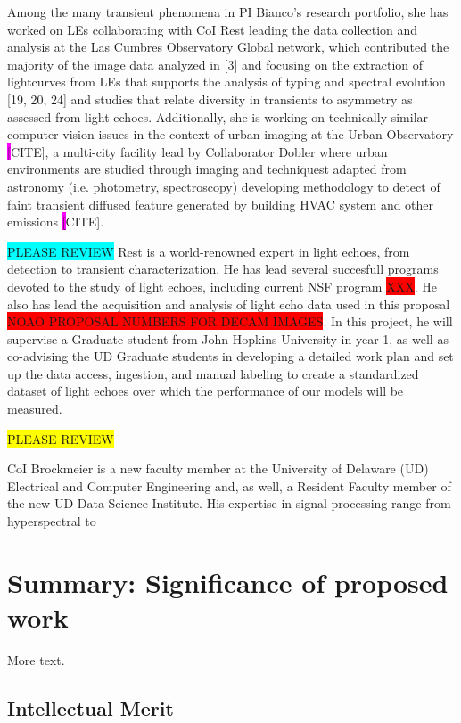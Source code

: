 \documentclass{proposalnsf}
\newcommand{\armin}[1]{\colorbox{cyan}{#1}}
\newcommand{\austin}[1]{\colorbox{yellow}{#1}}
\newcommand{\changeit}[1]{\colorbox{magenta}{#1}}
\begin{document}
Among the many transient phenomena in PI Bianco’s research portfolio, she has worked on LEs collaborating with CoI Rest leading the data collection and analysis at the Las Cumbres Observatory Global network, which contributed the majority of the image data analyzed in [3] and focusing on the extraction of lightcurves from LEs that supports the analysis of typing and spectral evolution [19, 20, 24]
and studies that relate diversity in transients to asymmetry as assessed from light echoes. Additionally, she is working on technically similar computer vision issues in the context of urban imaging at the Urban Observatory \changeit[CITE], a multi-city facility lead by Collaborator Dobler where urban environments are studied through imaging and techniquest adapted from astronomy (i.e. photometry, spectroscopy) developing methodology to detect of faint transient diffused feature generated by building HVAC system and other emissions \changeit[CITE].

\armin{PLEASE REVIEW}
Rest is a world-renowned expert in light echoes, from detection to transient characterization. He has lead several succesfull programs devoted to the study of light echoes, including current NSF program \colorbox{red}{XXX}. He also has lead the acquisition and analysis of light echo data used in this proposal \colorbox{red}{NOAO PROPOSAL NUMBERS FOR DECAM IMAGES}. In this project, he will supervise a Graduate student from John Hopkins University in year 1, as well as co-advising the UD Graduate students in developing a detailed work plan and set up the data access, ingestion, and manual labeling to create a standardized dataset of light echoes over which the performance of our models will be measured.   

\austin{PLEASE REVIEW}

CoI Brockmeier is a new faculty member at the University of Delaware (UD) Electrical and Computer Engineering and,  as well, a Resident Faculty member of the new UD Data Science Institute. His expertise in signal processing range from hyperspectral to 

\section{Summary:  Significance of proposed work}

More text.

\subsection{Intellectual Merit}
\end{document}
